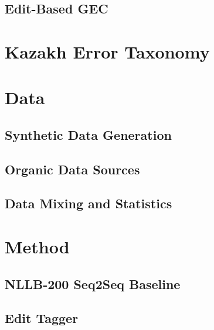 \documentclass[11pt]{article}
\begin{document}
\subsection{Edit-Based GEC}

\section{Kazakh Error Taxonomy}
\label{sec:taxonomy}


\section{Data}
\label{sec:data}

\subsection{Synthetic Data Generation}

\subsection{Organic Data Sources}

\subsection{Data Mixing and Statistics}

\section{Method}
\label{sec:method}

\subsection{NLLB-200 Seq2Seq Baseline}

\subsection{Edit Tagger}
\end{document}
